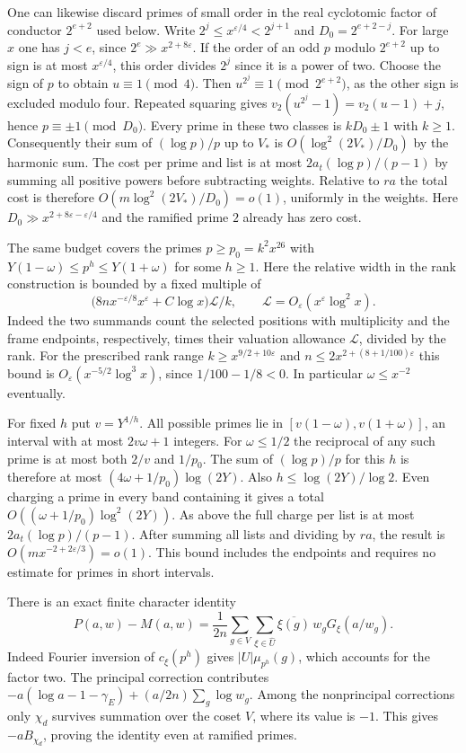 \documentclass[11pt]{amsart}
\theoremstyle{definition}
\theoremstyle{remark}
\begin{document}
One can likewise discard primes of small order in the real
cyclotomic factor of conductor $2^{e+2}$ used below. Write
$2^j\le x^{\varepsilon/4}<2^{j+1}$ and $D_0=2^{e+2-j}$.
For large $x$ one has $j<e$, since $2^e\gg x^{2+8\varepsilon}$.
If the order of an odd $p$ modulo $2^{e+2}$ up to sign is at
most $x^{\varepsilon/4}$, this order divides $2^j$ since it
is a power of two. Choose the sign of $p$ to obtain
$u\equiv1\pmod4$. Then $u^{2^j}\equiv1\pmod{2^{e+2}}$,
as the other sign is excluded modulo four. Repeated squaring
gives $v_2(u^{2^j}-1)=v_2(u-1)+j$, hence $p\equiv\pm1\pmod{D_0}$.
Every prime in these two classes is $kD_0\pm1$ with $k\ge1$.
Consequently their sum of $(\log p)/p$ up to $V_*$ is
$O(\log^2(2V_*)/D_0)$ by the harmonic sum. The cost per prime
and list is at most $2a_t(\log p)/(p-1)$ by summing all positive
powers before subtracting weights. Relative to $ra$ the total
cost is therefore $O(m\log^2(2V_*)/D_0)=o(1)$, uniformly in
the weights. Here $D_0\gg x^{2+8\varepsilon-\varepsilon/4}$
and the ramified prime $2$ already has zero cost.

The same budget covers the primes $p\ge p_0=k^2x^{26}$
with $Y(1-\omega)\le p^h\le Y(1+\omega)$ for some $h\ge1$.
Here the relative width in the rank construction is bounded by a
fixed multiple of
\[
 \big(8n x^{-\varepsilon/8} x^\varepsilon
       +C\log x\big)\mathcal L/k,
 \qquad \mathcal L=O_\varepsilon(x^\varepsilon\log^2 x).
\]
Indeed the two summands count the selected positions with multiplicity
and the frame endpoints, respectively, times their valuation allowance
$\mathcal L$, divided by the rank. For the prescribed rank range
$k\ge x^{9/2+10\varepsilon}$ and
$n\le2x^{2+(8+1/100)\varepsilon}$ this bound is
$O_\varepsilon(x^{-5/2}\log^3 x)$, since
$1/100-1/8<0$. In particular $\omega\le x^{-2}$ eventually.

For fixed $h$ put $v=Y^{1/h}$. All possible primes lie in
$[v(1-\omega),v(1+\omega)]$, an interval with at most
$2v\omega+1$ integers. For $\omega\le1/2$ the reciprocal
of any such prime is at most both $2/v$ and $1/p_0$.
The sum of $(\log p)/p$ for this $h$ is therefore at most
$(4\omega+1/p_0)\log(2Y)$. Also $h\le\log(2Y)/\log 2$.
Even charging a prime in every band containing it gives a total
$O((\omega+1/p_0)\log^2(2Y))$. As above the full charge per
list is at most $2a_t(\log p)/(p-1)$. After summing all lists
and dividing by $ra$, the result is
$O(m x^{-2+2\varepsilon/3})=o(1)$. This bound includes the
endpoints and requires no estimate for primes in short intervals.

There is an exact finite character identity
\[
 P(a,w)-M(a,w)=\frac1{2n}\sum_{g\in V}\sum_{\xi\in\widehat U}
                   \overline{\xi(g)}\,w_gG_\xi(a/w_g).
\]
Indeed Fourier inversion of $c_\xi(p^h)$ gives
$|U|\mu_{p^h}(g)$, which accounts for the factor two. The
principal correction contributes
$-a(\log a-1-\gamma_E)+(a/2n)\sum_g\log w_g$.
Among the nonprincipal corrections only $\chi_d$ survives summation
over the coset $V$, where its value is $-1$. This gives
$-aB_{\chi_d}$, proving the identity even at ramified primes.
\end{document}
